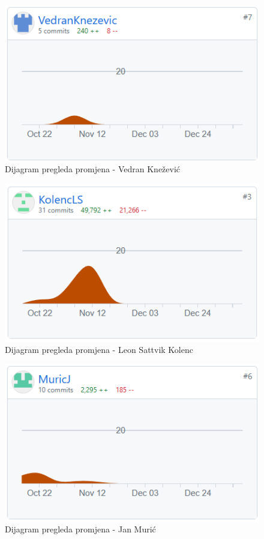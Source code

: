 		\begin{figure}[H]
			\includegraphics[scale=0.80]{slike/vedran.png} %
			\centering
			\caption{Dijagram pregleda promjena - Vedran Knežević}
			\label{fig:DijagramPregledaPromjena}
		\end{figure}

		\begin{figure}[H]
			\includegraphics[scale=0.80]{slike/leon.png} %
			\centering
			\caption{Dijagram pregleda promjena - Leon Sattvik Kolenc}
			\label{fig:DijagramPregledaPromjena}
		\end{figure}

		\begin{figure}[H]
			\includegraphics[scale=0.80]{slike/jan.png} %
			\centering
			\caption{Dijagram pregleda promjena - Jan Murić}
			\label{fig:DijagramPregledaPromjena}
		\end{figure}

